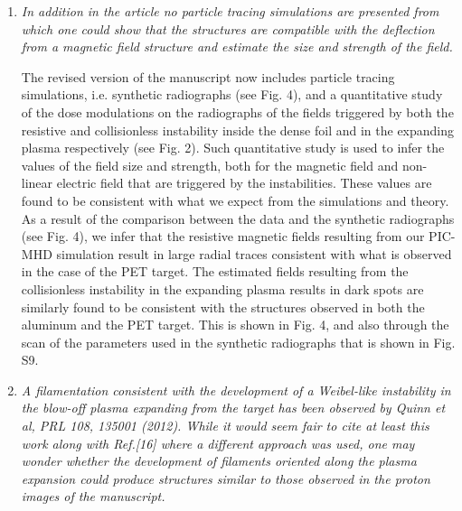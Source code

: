 \documentclass[aps,showpacs,superscriptaddress]{revtex4}%
\begin{document}
\begin{enumerate}
\item \textit{In addition in the article no particle tracing simulations are presented from which one could show that the structures are compatible with the deflection from a magnetic field structure and estimate the size and strength of the field. }

The revised version of the manuscript now includes particle tracing simulations, i.e. synthetic radiographs (see Fig. 4), and a quantitative study of the dose modulations on the radiographs of the  fields triggered by both  the resistive and collisionless instability inside the dense foil and in the expanding plasma respectively (see Fig. 2). Such quantitative study is used to infer the values of the field size and strength, both for the magnetic field and non-linear electric field  that are triggered by the instabilities.  These values are found to be consistent with what we expect from the simulations and theory.
As a result of the comparison between the data and the synthetic radiographs (see Fig. 4), we infer that the resistive magnetic fields resulting from our PIC-MHD simulation result in large radial traces consistent with what is observed in the case of the PET target. The estimated fields resulting from the collisionless instability in the expanding plasma results in dark spots are similarly found to be consistent with the structures observed in both the aluminum and the PET target. This is shown in Fig. 4, and also through the scan of the parameters used in the synthetic radiographs that is shown in Fig. S9.

\item \textit{A filamentation consistent with the development of a Weibel-like instability in the blow-off plasma expanding from the target has been observed by Quinn et al, PRL 108, 135001 (2012). While it would seem fair to cite at least this work along with Ref.[16] where a different approach was used, one may wonder whether the development of filaments oriented along the plasma expansion could produce structures similar to those observed in the proton images of the manuscript. }


\end{enumerate}
\end{document}

